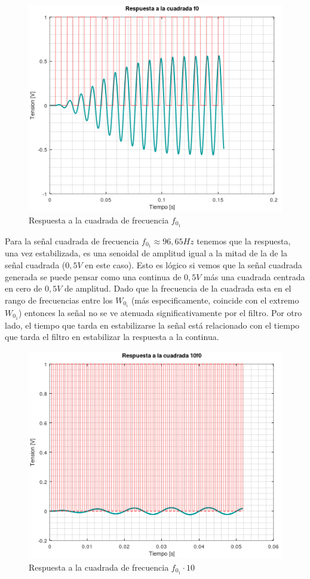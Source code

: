 \documentclass[11pt,a4paper]{report}
\begin{document}
\bigskip
\begin{figure}[h!]
\includegraphics[scale=1]{RtaCuadradaWo12.png}
\caption{Respuesta a la cuadrada de frecuencia $f_{0_{1}}$}
\end{figure}

Para la señal cuadrada de frecuencia $f_{0_{1}} \approx 96,65Hz$ tenemos que la 
respuesta, una vez estabilizada, es una senoidal de amplitud igual a la mitad de la 
de la señal cuadrada ($0,5V$ en este caso). Esto es lógico si vemos que la señal 
cuadrada generada se puede pensar como una continua de $0,5V$ más una cuadrada centrada en cero de $0,5V$ de amplitud. Dado que la frecuencia de la cuadrada esta en el rango de frecuencias entre los $W_{0_{i}}$ (más especificamente, coincide con el extremo $W_{0_{1}}$) entonces  la señal no se ve atenuada significativamente por el filtro. Por otro lado, el tiempo que tarda en estabilizarse la señal está relacionado con el tiempo que tarda el filtro en estabilizar la respuesta a la continua.

\begin{figure}[h!]
\includegraphics[scale=1]{RtaCuadradaWo13.png}
\caption{Respuesta a la cuadrada de frecuencia $f_{0_{1}} \cdot 10$}
\end{figure}
\end{document}
